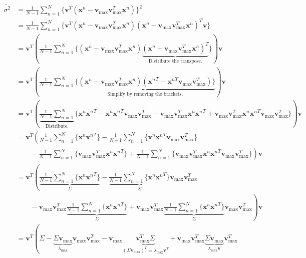 \documentclass{article}
\newcommand{\vecv}{\boldsymbol{v}}
\newcommand{\vecx}{\boldsymbol{x}}
\begin{document}
\begin{align*}
\tilde{\sigma^2} &= \frac{1}{N-1} \sum_{n=1}^N \{ \vecv^T (\vecx^n - \vecv_{\max} \vecv_{\max}^T \vecx^n) \}^2 \\
&= \frac{1}{N-1} \sum_{n=1}^N \{  \vecv^T (\vecx^n - \vecv_{\max} \vecv_{\max}^T \vecx^n) (\vecx^n - \vecv_{\max} \vecv_{\max}^T \vecx^n)^T \vecv \} \\
&=\vecv^T \left( \frac{1}{N-1} \sum_{n=1}^N
 \{  
 	(\vecx^n - \vecv_{\max} \vecv_{\max}^T \vecx^n) 
 	\underbrace{(\vecx^n - \vecv_{\max} \vecv_{\max}^T \vecx^n)^T}_{\text{Distribute the transpose.}}
\}  \right) \vecv \\
&=\vecv^T \left( \frac{1}{N-1} \sum_{n=1}^N 
	\underbrace{
		\{  
			(\vecx^n - \vecv_{\max} \vecv_{\max}^T \vecx^n) 
			({\vecx^n}^T- {\vecx^n}^T \vecv_{\max} \vecv_{\max}^T)
		\}
	}_{\text{Simplify by removing the brackets.}}
\right) \vecv \\
&=\vecv^T \left( \underbrace{\frac{1}{N-1} \sum_{n=1}^N}_{\text{Distribute.}}
\{  
	\vecx^n {\vecx^n}^T 
	- \vecx^n {\vecx^n}^T \vecv_{\max} \vecv_{\max}^T
	- \vecv_{\max} \vecv_{\max}^T \vecx^n {\vecx^n}^T
	+  \vecv_{\max} \vecv_{\max}^T \vecx^n {\vecx^n}^T \vecv_{\max} \vecv_{\max}^T
\}
\right) \vecv \\
&=\vecv^T \left( 
\frac{1}{N-1} \sum_{n=1}^N \{ \vecx^n {\vecx^n}^T \} 
- \frac{1}{N-1} \sum_{n=1}^N \{ \vecx^n {\vecx^n}^T \vecv_{\max} \vecv_{\max}^T \} 
\right.\\
    &  \left. \qquad- \frac{1}{N-1} \sum_{n=1}^N \{ \vecv_{\max} \vecv_{\max}^T \vecx^n {\vecx^n}^T \} 
+ \frac{1}{N-1} \sum_{n=1}^N \{  \vecv_{\max} \vecv_{\max}^T \vecx^n {\vecx^n}^T \vecv_{\max} \vecv_{\max}^T \} 
\right) \vecv \\
&=\vecv^T \left( 
\underbrace{\frac{1}{N-1} \sum_{n=1}^N \{ \vecx^n {\vecx^n}^T \}}_{\Sigma}
- \underbrace{\frac{1}{N-1} \sum_{n=1}^N \{ \vecx^n {\vecx^n}^T \}}_{\Sigma} \vecv_{\max} \vecv_{\max}^T 
\right.\\
    & \left. \qquad- \vecv_{\max} \vecv_{\max}^T \underbrace{\frac{1}{N-1} \sum_{n=1}^N \{ \vecx^n {\vecx^n}^T \}}_{\Sigma}
+  \vecv_{\max} \vecv_{\max}^T \underbrace{ \frac{1}{N-1} \sum_{n=1}^N \{ \vecx^n {\vecx^n}^T \} }_{\Sigma} \vecv_{\max} \vecv_{\max}^T 
\right) \vecv \\
&=\vecv^T \left( 
\Sigma 
- \underbrace{ \Sigma \vecv_{\max}}_{\lambda_{\max}} \vecv_{\max} \vecv_{\max}^T 
- \vecv_{\max} \underbrace{ \vecv_{\max}^T \Sigma }_{(\Sigma \vecv_{\max})^T = \lambda_{\max} \vecv^T}
+  \vecv_{\max} \vecv_{\max}^T \underbrace { \Sigma \vecv_{\max} }_{\lambda_{\max} \vecv} \vecv_{\max}^T 

\end{align*}
\end{document}
